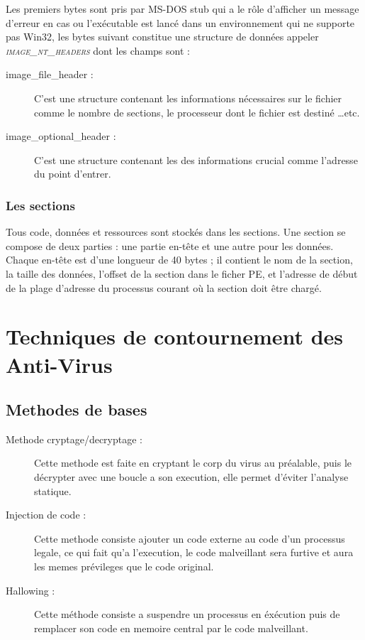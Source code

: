     Les premiers bytes sont pris par MS-DOS stub qui a le rôle d'afficher un message d'erreur en cas ou 
    l'exécutable est lancé dans un environnement qui ne supporte pas Win32, les bytes suivant constitue 
    une structure de données appeler \emph{\textsc{image\_nt\_headers}} dont les champs sont :
    \begin{description}
        \item[image\_file\_header :] C'est une structure contenant les informations nécessaires
            sur le fichier comme le nombre de sections, le processeur dont le fichier est destiné \ldots etc.
        \item[image\_optional\_header :] C'est une structure contenant les des informations crucial comme l'adresse
            du point d'entrer.
    \end{description}

    \subsubsection{Les sections}
    Tous code, données et ressources sont stockés dans les sections. Une section se compose de deux 
    parties : une partie en-tête et une autre pour les données. Chaque en-tête est d'une longueur de 40 
    bytes ; il contient le nom de la section, la taille des données, l'offset de la section dans 
    le ficher PE, et l'adresse de début de la plage d'adresse du processus courant où la section doit être 
    chargé. \cite{pe4}

\section{Techniques de contournement des Anti-Virus}
    \subsection{Methodes de bases}
    \begin{description}
        \item[Methode cryptage/decryptage :] Cette methode est faite en cryptant le corp du virus au préalable, puis le décrypter avec une boucle a son execution, elle permet d'éviter l'analyse statique.

        \item[Injection de code :] Cette methode consiste ajouter un code externe au code d'un processus legale, ce qui fait qu'a l'execution, le code malveillant sera furtive et aura les memes prévileges que le code original.

        \item[Hallowing :] Cette méthode consiste a suspendre un processus en éxécution puis de remplacer son code en memoire central par le code malveillant.
    \end{description}

